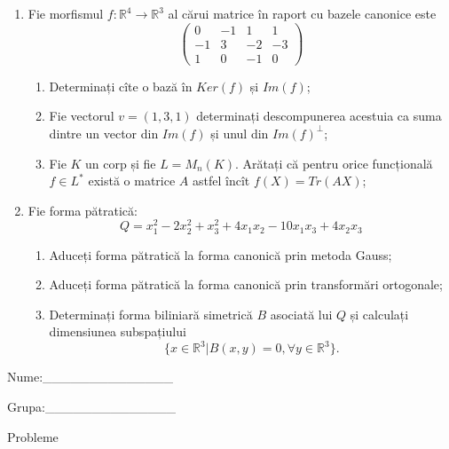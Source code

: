 \documentclass{article}
\begin{document}
\begin{enumerate}
 \item Fie morfismul $f:\mathbb{R}^4 \to \mathbb{R}^3$ al cărui matrice în raport cu bazele canonice este
$$\begin{pmatrix}
0&-1&1&1\\
-1&3&-2&-3\\
1&0&-1&0
\end{pmatrix}$$

\begin{enumerate}
\item Determinați cîte o bază în $Ker(f)$ și $Im(f)$;
\item Fie vectorul $v=(1,3,1)$ determinați descompunerea acestuia ca suma dintre un vector din $Im(f)$ și unul din $Im(f)^\perp$;
\item Fie $K$ un corp și fie $L=M_n(K)$. Arătați că pentru orice funcțională $f \in L^*$ există o matrice $A$ astfel încît $f(X)=Tr(AX)$;
\end{enumerate}
\item Fie forma pătratică:
$$Q= x_1^2-2x_2^2+x_3^2+4x_1x_2-10x_1x_3+4x_2x_3$$

\begin{enumerate}
\item Aduceți forma pătratică la forma canonică prin metoda Gauss;
\item Aduceți forma pătratică la forma canonică prin transformări ortogonale;
\item Determinați forma biliniară simetrică $B$ asociată lui $Q$ și calculați dimensiunea subspațiului
$$\{x \in \mathbb{R}^3 | B(x,y)=0,\forall y \in \mathbb{R}^3\}.$$

\end{enumerate}
\end{enumerate}
\newpage
\begin{flushright}
Nume:\_\_\_\_\_\_\_\_\_\_\_\_\_\_
 
 
Grupa:\_\_\_\_\_\_\_\_\_\_\_\_\_\_
\end{flushright}
\begin{center}
\vspace{2cm}
{\Large Probleme}
\vspace{2cm}
\end{center}
\end{document}

